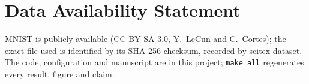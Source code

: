 
\section*{Data Availability Statement}

MNIST is publicly available (CC BY-SA 3.0, Y.~LeCun and C.~Cortes); the
exact file used is identified by its SHA-256 checksum, recorded by
scitex-dataset. The code, configuration and manuscript are in this project;
\texttt{make all} regenerates every result, figure and claim.

\label{data and code availability}


